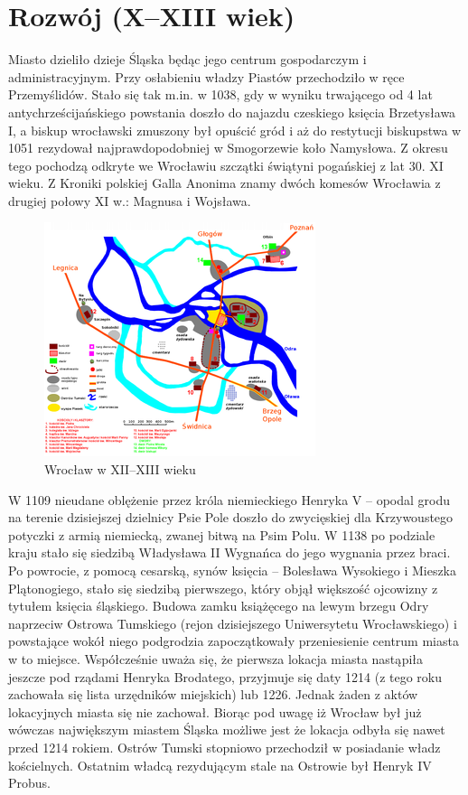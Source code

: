 \documentclass{article}
\begin{document}
\section{Rozwój (X–XIII wiek)}

Miasto dzieliło dzieje Śląska będąc jego centrum gospodarczym i administracyjnym. Przy osłabieniu władzy Piastów przechodziło w ręce Przemyślidów. Stało się tak m.in. w 1038, gdy w wyniku trwającego od 4 lat antychrześcijańskiego powstania doszło do najazdu czeskiego księcia Brzetysława I, a biskup wrocławski zmuszony był opuścić gród i aż do restytucji biskupstwa w 1051 rezydował najprawdopodobniej w Smogorzewie koło Namysłowa. Z okresu tego pochodzą odkryte we Wrocławiu szczątki świątyni pogańskiej z lat 30. XI wieku. Z Kroniki polskiej Galla Anonima znamy dwóch komesów Wrocławia z drugiej połowy XI w.: Magnusa i Wojsława.
\bigskip
\newline
\begin{figure}[h]
\centering
\includegraphics[scale=0.5]{1.png}
\caption{Wrocław w XII–XIII wieku}
\end{figure}
\bigskip
\newline
W 1109 nieudane oblężenie przez króla niemieckiego Henryka V – opodal grodu na terenie dzisiejszej dzielnicy Psie Pole doszło do zwycięskiej dla Krzywoustego potyczki z armią niemiecką, zwanej bitwą na Psim Polu.
\bigskip
\newline
W 1138 po podziale kraju stało się siedzibą Władysława II Wygnańca do jego wygnania przez braci. Po powrocie, z pomocą cesarską, synów księcia – Bolesława Wysokiego i Mieszka Plątonogiego, stało się siedzibą pierwszego, który objął większość ojcowizny z tytułem księcia śląskiego.
\bigskip
\newline
Budowa zamku książęcego na lewym brzegu Odry naprzeciw Ostrowa Tumskiego (rejon dzisiejszego Uniwersytetu Wrocławskiego) i powstające wokół niego podgrodzia zapoczątkowały przeniesienie centrum miasta w to miejsce. Współcześnie uważa się, że pierwsza lokacja miasta nastąpiła jeszcze pod rządami Henryka Brodatego, przyjmuje się daty 1214 (z tego roku zachowała się lista urzędników miejskich) lub 1226. Jednak żaden z aktów lokacyjnych miasta się nie zachował. Biorąc pod uwagę iż Wrocław był już wówczas największym miastem Śląska możliwe jest że lokacja odbyła się nawet przed 1214 rokiem. Ostrów Tumski stopniowo przechodził w posiadanie władz kościelnych. Ostatnim władcą rezydującym stale na Ostrowie był Henryk IV Probus.
\end{document}
